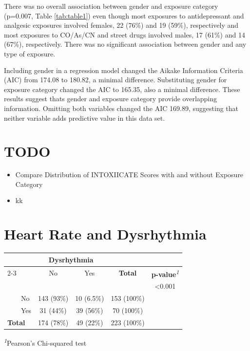 \documentclass[
]{article}
\providecommand{\tightlist}{%
  \setlength{\itemsep}{0pt}\setlength{\parskip}{0pt}}
\begin{document}
There was no overall association between gender and exposure category (p=0.007, Table \ref{tab:table1}) even though most exposures to antidepressant and analgesic exposures involved females, 22 (76\%) and 19 (59\%), respectively and most exposures to CO/As/CN and street drugs involved males, 17 (61\%) and 14 (67\%), respectively. There was no significant association between gender and any type of exposure.

Including gender in a regression model changed the Aikake Information Criteria (AIC) from 174.08 to 180.82, a minimal difference. Substituting gender for exposure category changed the AIC to 165.35, also a minimal difference. These results suggest thats gender and exposure category provide overlapping information. Omitting both variables changed the AIC 169.89, suggesting that neither variable adds predictive value in this data set.

\section*{TODO}\label{todo}

\begin{itemize}
\tightlist
\item
  Compare Distribution of INTOXIICATE Scores with and without Exposure Category
\item
  kk
\end{itemize}

\section*{Heart Rate and Dysrhythmia}\label{heart-rate-and-dysrhythmia}

\begin{table}[t]
\fontsize{12.0pt}{14.0pt}\selectfont
\begin{tabular*}{\linewidth}{@{\extracolsep{\fill}}lcccc}
\toprule
 & \multicolumn{2}{c}{\textbf{Dysrhythmia}} &  &  \\ 
\cmidrule(lr){2-3}
 & No & Yes & \textbf{Total} & \textbf{p-value}\textsuperscript{\textit{1}} \\ 
\midrule\addlinespace[2.5pt]
{\bfseries HR faster than 100 bpm} &  &  &  & <0.001 \\ 
    No & 143 (93\%) & 10 (6.5\%) & 153 (100\%) &  \\ 
    Yes & 31 (44\%) & 39 (56\%) & 70 (100\%) &  \\ 
{\bfseries Total} & 174 (78\%) & 49 (22\%) & 223 (100\%) &  \\ 
\bottomrule
\end{tabular*}
\begin{minipage}{\linewidth}
\textsuperscript{\textit{1}}Pearson's Chi-squared test\\
\end{minipage}
\end{table}
\end{document}
